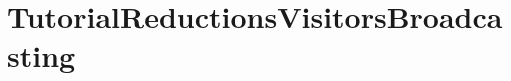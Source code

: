 \hypertarget{group___tutorial_reductions_visitors_broadcasting}{}\section{Tutorial\+Reductions\+Visitors\+Broadcasting}
\label{group___tutorial_reductions_visitors_broadcasting}
